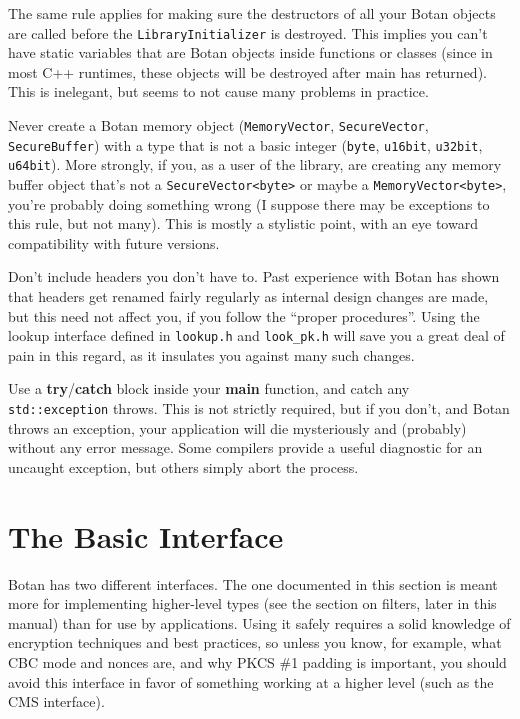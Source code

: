 \documentclass{article}
\newcommand{\filename}[1]{\texttt{#1}}
\newcommand{\function}[1]{\textbf{#1}}
\newcommand{\type}[1]{\texttt{#1}}
\begin{document}
The same rule applies for making sure the destructors of all your Botan objects
are called before the \type{LibraryInitializer} is destroyed. This implies you
can't have static variables that are Botan objects inside functions or classes
(since in most C++ runtimes, these objects will be destroyed after main has
returned). This is inelegant, but seems to not cause many problems in practice.

Never create a Botan memory object (\type{MemoryVector}, \type{SecureVector},
\type{SecureBuffer}) with a type that is not a basic integer (\type{byte},
\type{u16bit}, \type{u32bit}, \type{u64bit}). More strongly, if you, as a user
of the library, are creating any memory buffer object that's not a
\type{SecureVector<byte>} or maybe a \type{MemoryVector<byte>}, you're probably
doing something wrong (I suppose there may be exceptions to this rule, but not
many). This is mostly a stylistic point, with an eye toward compatibility with
future versions.

Don't include headers you don't have to. Past experience with Botan has shown
that headers get renamed fairly regularly as internal design changes are made,
but this need not affect you, if you follow the ``proper procedures''. Using
the lookup interface defined in \filename{lookup.h} and \filename{look\_pk.h}
will save you a great deal of pain in this regard, as it insulates you against
many such changes.

Use a \function{try}/\function{catch} block inside your \function{main}
function, and catch any \type{std::exception} throws. This is not strictly
required, but if you don't, and Botan throws an exception, your application
will die mysteriously and (probably) without any error message. Some compilers
provide a useful diagnostic for an uncaught exception, but others simply abort
the process.

\pagebreak

\section{The Basic Interface}

Botan has two different interfaces. The one documented in this section is meant
more for implementing higher-level types (see the section on filters, later in
this manual) than for use by applications. Using it safely requires a solid
knowledge of encryption techniques and best practices, so unless you know, for
example, what CBC mode and nonces are, and why PKCS \#1 padding is important,
you should avoid this interface in favor of something working at a higher level
(such as the CMS interface).
\end{document}
